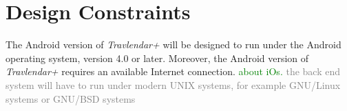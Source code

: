 \section{Design Constraints}
The Android version of \emph{Travlendar+} will be designed to run under the Android operating system, version 4.0 or later.
Moreover, the Android version of \emph{Travlendar+} requires an available Internet connection. \textcolor{green}{about iOs.}
\textcolor{Gray}{the back end system will have to run under modern UNIX systems, for example GNU/Linux systems or GNU/BSD systems}